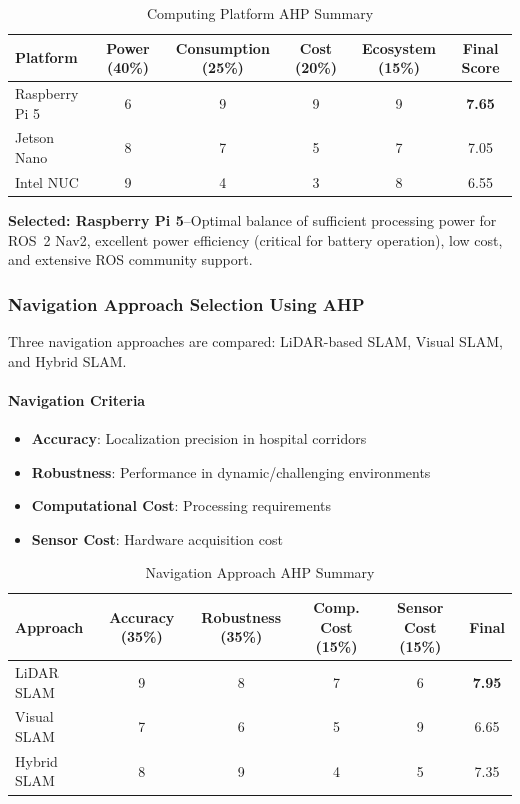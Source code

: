 \begin{table}[H]
\centering
\caption{Computing Platform AHP Summary}
\small
\begin{tabular}{lcccc|c}
\toprule
\textbf{Platform} & \textbf{Power (40\%)} & \textbf{Consumption (25\%)} & \textbf{Cost (20\%)} & \textbf{Ecosystem (15\%)} & \textbf{Final Score} \\
\midrule
Raspberry Pi 5 & 6 & 9 & 9 & 9 & \textbf{7.65} \\
Jetson Nano & 8 & 7 & 5 & 7 & 7.05 \\
Intel NUC & 9 & 4 & 3 & 8 & 6.55 \\
\bottomrule
\end{tabular}
\end{table}

\textbf{Selected: Raspberry Pi 5}--Optimal balance of sufficient processing power for ROS~2 Nav2, excellent power efficiency (critical for battery operation), low cost, and extensive ROS community support.

\subsubsection{Navigation Approach Selection Using AHP}
Three navigation approaches are compared: LiDAR-based SLAM, Visual SLAM, and Hybrid SLAM.

\paragraph{Navigation Criteria}
\begin{itemize}
    \item \textbf{Accuracy}: Localization precision in hospital corridors
    \item \textbf{Robustness}: Performance in dynamic/challenging environments
    \item \textbf{Computational Cost}: Processing requirements
    \item \textbf{Sensor Cost}: Hardware acquisition cost
\end{itemize}

\begin{table}[H]
\centering
\caption{Navigation Approach AHP Summary}
\small
\begin{tabular}{lcccc|c}
\toprule
\textbf{Approach} & \textbf{Accuracy (35\%)} & \textbf{Robustness (35\%)} & \textbf{Comp. Cost (15\%)} & \textbf{Sensor Cost (15\%)} & \textbf{Final} \\
\midrule
LiDAR SLAM & 9 & 8 & 7 & 6 & \textbf{7.95} \\
Visual SLAM & 7 & 6 & 5 & 9 & 6.65 \\
Hybrid SLAM & 8 & 9 & 4 & 5 & 7.35 \\
\bottomrule
\end{tabular}
\end{table}

